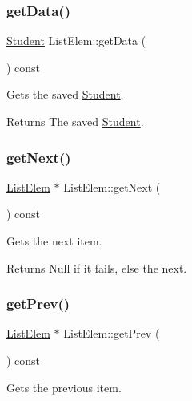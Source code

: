 \subsubsection{\texorpdfstring{get\+Data()}{getData()}}
{\footnotesize\ttfamily \hyperlink{class_student}{Student} List\+Elem\+::get\+Data (\begin{DoxyParamCaption}{ }\end{DoxyParamCaption}) const}



Gets the saved \hyperlink{class_student}{Student}. 

\begin{DoxyReturn}{Returns}
The saved \hyperlink{class_student}{Student}. 
\end{DoxyReturn}
\mbox{\label{class_list_elem_ac615618c96d2bacc597ba59a4e8e2620}} 
\subsubsection{\texorpdfstring{get\+Next()}{getNext()}}
{\footnotesize\ttfamily \hyperlink{class_list_elem}{List\+Elem} $\ast$ List\+Elem\+::get\+Next (\begin{DoxyParamCaption}{ }\end{DoxyParamCaption}) const}



Gets the next item. 

\begin{DoxyReturn}{Returns}
Null if it fails, else the next. 
\end{DoxyReturn}
\mbox{\label{class_list_elem_a5e0941e76c8f85252a84d3ba3b874bc3}} 
\subsubsection{\texorpdfstring{get\+Prev()}{getPrev()}}
{\footnotesize\ttfamily \hyperlink{class_list_elem}{List\+Elem} $\ast$ List\+Elem\+::get\+Prev (\begin{DoxyParamCaption}{ }\end{DoxyParamCaption}) const}



Gets the previous item. 

